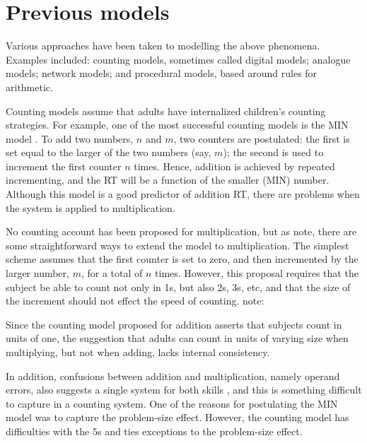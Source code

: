
\section{Previous models}\label{s:xprevmod}

Various approaches have been taken to modelling the above phenomena.
Examples included: counting models, sometimes called digital models;
analogue models; network models; and procedural models, based around
rules for arithmetic.

Counting models assume that adults have internalized children's counting
strategies. For example, one of the most successful
counting models is the MIN model \cite{groechron}. To add two numbers,
$n$ and $m$, two counters are postulated: the first is set equal to the
larger of the two numbers (say, $m$); the second is used to increment
the first counter $n$ times.  Hence, addition is achieved by repeated
incrementing, and the RT will be a function of the smaller (MIN) number.
Although this model is a good predictor of addition RT, there are
problems when the system is applied to multiplication.

No counting account has been proposed for multiplication, but
as  note, there are some straightforward ways to extend
the model to multiplication.  The simplest scheme assumes
that the first counter is set to zero, and then incremented by the
larger number, $m$, for a total of $n$ times.  However, this proposal
requires that the subject be able to count
not only in 1s, but also 2s, 3s, etc, and that the size of the
increment should not effect the speed of counting.
 note:
\begin{ssquote}
Since the counting model proposed for addition asserts that subjects
count in units of one, the suggestion that adults can count in units of
varying size when multiplying, but not when adding, lacks internal
consistency.
\end{ssquote}

In addition, confusions between addition and multiplication, namely operand
errors, also suggests a single system for both skills
\cite{winkasso,millcogn}, and this is something
difficult to capture in a
counting system.  One of the reasons for postulating the MIN model was
to capture the problem-size effect.  However, the counting model has
difficulties with the 5s and ties exceptions
to the problem-size effect.


